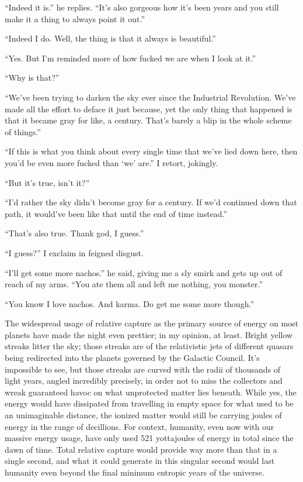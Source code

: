 \documentclass{book}
\begin{document}
			``Indeed it is.'' he replies. ``It's also gorgeous how it's been years and you still
			make it a thing to always point it out.''

			``Indeed I do. Well, the thing is that it always is beautiful.''

			``Yes. But I'm reminded more of how fucked we are when I look at it.''

			``Why is that?''

			``We've been trying to darken the sky ever since the Industrial Revolution. We've
			made all the effort to deface it just because, yet the only thing that happened is
			that it became gray for like, a century. That's barely a blip in the whole scheme of
			things.''

			``If this is what you think about every single time that we've lied down here, then
			you'd be even more fucked than `we' are.'' I retort, jokingly.

			``But it's true, isn't it?''

			``I'd rather the sky didn't become gray for a century. If we'd continued down that
			path, it would've been like that until the end of time instead.''

			``That's also true. Thank god, I guess.''

			``I guess?'' I exclaim in feigned disgust.

			``I'll get some more nachos.'' he said, giving me a sly smirk and gets up out of reach
			of my arms. ``You ate them all and left me nothing, you monster.''

			``You know I love nachos. And karma. Do get me some more though.''

			The widespread usage of relative capture as the primary source of energy on most
			planets have made the night even prettier; in my opinion, at least. Bright yellow
			streaks litter the sky; those streaks are of the relativistic jets of different quasars
			being redirected into the planets governed by the Galactic Council. It's impossible to
			see, but those streaks are curved with the radii of thousands of light years, angled incredibly
			precisely, in order not to miss the collectors and wreak guaranteed havoc on what
			unprotected matter lies beneath. While yes, the energy would have dissipated from
			travelling in empty space for what used to be an unimaginable distance, the ionized
			matter would still be carrying joules of energy in the range of decillions. For
			context, humanity, even now with our massive energy usage, have only used 521
			yottajoules of energy in total since the dawn of time. Total relative capture would
			provide way more than that in a single second, and what it could generate in this singular
			second would last humanity even beyond the final minimum entropic years of the universe.
\end{document}
